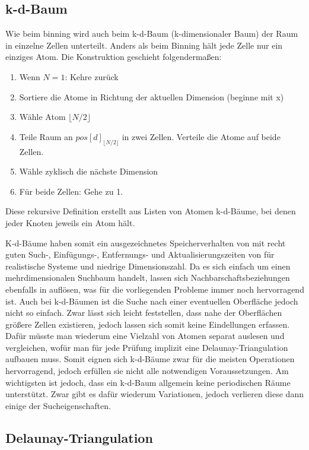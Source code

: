 \subsection{k-d-Baum}

Wie beim binning wird auch beim k-d-Baum (k-dimensionaler Baum) der Raum in einzelne Zellen unterteilt.
Anders als beim Binning hält jede Zelle nur ein einziges Atom.
Die Konstruktion geschieht folgendermaßen:

\begin{enumerate}
\item Wenn $N=1$: Kehre zurück
\item Sortiere die Atome in Richtung der aktuellen Dimension (beginne mit x)
\item Wähle Atom $\lfloor N/2 \rfloor$
\item Teile Raum an $pos[d]_{\lfloor N/2 \rfloor}$ in zwei Zellen. Verteile die Atome auf beide Zellen.
\item Wähle zyklisch die nächste Dimension
\item Für beide Zellen: Gehe zu 1.
\end{enumerate}

Diese rekursive Definition erstellt aus Listen von Atomen k-d-Bäume, bei denen jeder Knoten jeweils ein Atom hält.

K-d-Bäume haben somit ein ausgezeichnetes Speicherverhalten von  mit recht guten Such-, Einfügungs-, Entfernungs- und Aktualisierungszeiten von  für realistische Systeme und niedrige Dimensionszahl.
Da es sich einfach um einen mehrdimensionalen Suchbaum handelt, lassen sich Nachbarschaftsbeziehungen ebenfalls in  auflösen, was für die vorliegenden Probleme immer noch hervorragend ist.
Auch bei k-d-Bäumen ist die Suche nach einer eventuellen Oberfläche jedoch nicht so einfach.
Zwar lässt sich leicht feststellen, dass nahe der Oberflächen größere Zellen existieren, jedoch lassen sich somit keine Eindellungen erfassen.
Dafür müsste man wiederum eine Vielzahl von Atomen separat auslesen und vergleichen, wofür man für jede Prüfung implizit eine Delaunay-Triangulation aufbauen muss.
Somit eignen sich k-d-Bäume zwar für die meisten Operationen hervorragend, jedoch erfüllen sie nicht alle notwendigen Voraussetzungen.
Am wichtigsten ist jedoch, dass ein k-d-Baum allgemein keine periodischen Räume unterstützt.
Zwar gibt es dafür wiederum Variationen, jedoch verlieren diese dann einige der Sucheigenschaften.

\subsection{Delaunay-Triangulation}

